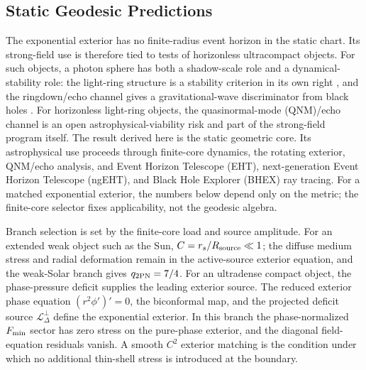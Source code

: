 \documentclass[12pt,a4paper]{article}
\begin{document}
\subsection{Static Geodesic Predictions}

The exponential exterior has no finite-radius event horizon in the static chart. Its strong-field use is therefore tied to tests of horizonless ultracompact objects. For such objects, a photon sphere has both a shadow-scale role and a dynamical-stability role: the light-ring structure is a stability criterion in its own right \cite{Cunha2017}, and the ringdown/echo channel gives a gravitational-wave discriminator from black holes \cite{Cardoso2016}. For horizonless light-ring objects, the quasinormal-mode (QNM)/echo channel is an open astrophysical-viability risk and part of the strong-field program itself. The result derived here is the static geometric core. Its astrophysical use proceeds through finite-core dynamics, the rotating exterior, QNM/echo analysis, and Event Horizon Telescope (EHT), next-generation Event Horizon Telescope (ngEHT), and Black Hole Explorer (BHEX) ray tracing.
For a matched exponential exterior, the numbers below depend only on the metric;
the finite-core selector fixes applicability, not the geodesic algebra.

Branch selection is set by the finite-core load and source amplitude. For an extended
weak object such as the Sun,
$C=r_s/R_{\rm source}\ll 1$; the diffuse medium stress and radial deformation
remain in the active-source exterior equation, and the weak-Solar branch gives
$q_{2{\rm PN}}=7/4$. For an ultradense compact object, the phase-pressure
deficit supplies the leading exterior source. The reduced exterior phase equation
$(r^2\phi')'=0$, the biconformal map, and the projected deficit source
$\mathcal L_\Delta^\perp$ define the exponential exterior. In this branch the
phase-normalized $F_{\rm min}$ sector has zero stress on the pure-phase exterior, and the
diagonal field-equation residuals vanish. A smooth $C^2$ exterior matching is
the condition under which no additional thin-shell stress is introduced at the
boundary.
\end{document}
